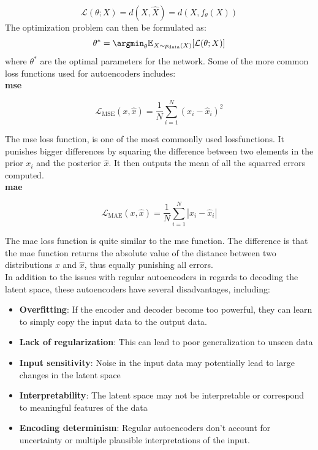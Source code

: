 \begin{equation}
    \mathcal{L}(\theta; X) = d(X, \hat{X}) = d(X, f_\theta(X))
\end{equation}
The optimization problem can then be formulated as:
\begin{equation}
    \theta^* = \argmin_{\theta} \mathbb{E}_{X \sim p_{\text{data}}(X)}[\mathcal{L}(\theta; X)]
\end{equation}
where $\theta^*$ are the optimal parameters for the network. Some of the more common loss functions used for autoencoders includes: \\

\textbf{\acrfull{mse}}

\begin{equation}\label{eq:mse}
    \mathcal{L}_{\text{MSE}}(x, \hat{x}) = \dfrac{1}{N}  \sum_{i=1}^{N}(x_i-\hat{x}_i)^2
\end{equation}

The \acrshort{mse} loss function, is one of the most commonlly used lossfunctions. It punishes bigger differences by squaring the difference between two elements in the prior $x_i$ and the posterior $\hat{x}$. It then outputs the mean of all the squarred errors computed. \\

\textbf{\acrfull{mae}}

\begin{equation}\label{eq:mae}
    \mathcal{L}_{\text{MAE}}(x, \hat{x}) = \dfrac{1}{N}  \sum_{i=1}^{N}|x_i-\hat{x}_i|
\end{equation}

The \acrshort{mae} loss function is quite similar to the \acrshort{mse} function. The difference is that the \acrshort{mae} function returns the absolute value of the distance between two distributions $x$ and $\hat{x}$, thus equally punishing all errors. \\

In addition to the issues with regular autoencoders in regards to decoding the latent space, these autoencoders have several disadvantages, including:

\begin{itemize}
    \item \textbf{Overfitting}: If the encoder and decoder become too powerful, they can learn to simply copy the input data to the output data.
    \item \textbf{Lack of regularization}: This can lead to poor generalization to unseen data
    \item \textbf{Input sensitivity}: Noise in the input data may potentially lead to large changes in the latent space
    \item \textbf{Interpretability}: The latent space may not be interpretable or correspond to meaningful features of the data
    \item \textbf{Encoding determinism}: Regular autoencoders don't account for uncertainty or multiple plausible interpretations of the input.
\end{itemize}